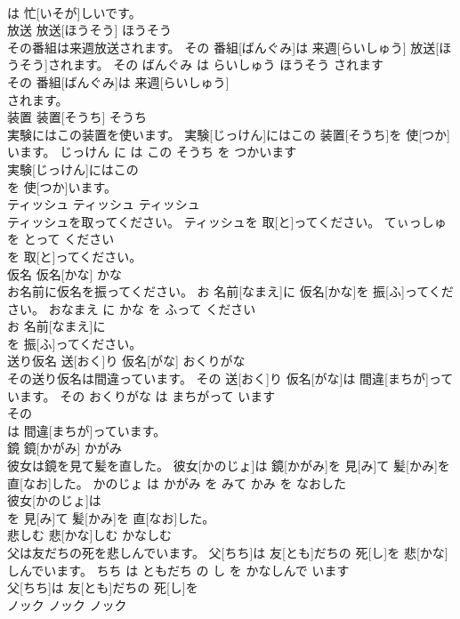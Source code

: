 \documentclass[8pt]{extreport}
\begin{document}
\begin{CJK}{UTF8}{min}
\\	は 忙[いそが]しいです。			
\\	放送	放送[ほうそう]	ほうそう	
\\	その番組は来週放送されます。	その 番組[ばんぐみ]は 来週[らいしゅう] 放送[ほうそう]されます。	その ばんぐみ は らいしゅう ほうそう されます	
\\	その 番組[ばんぐみ]は 来週[らいしゅう]
\\	されます。			
\\	装置	装置[そうち]	そうち	
\\	実験にはこの装置を使います。	実験[じっけん]にはこの 装置[そうち]を 使[つか]います。	じっけん に は この そうち を つかいます	
\\	実験[じっけん]にはこの
\\	を 使[つか]います。			
\\	ティッシュ	ティッシュ	ティッシュ	
\\	ティッシュを取ってください。	ティッシュを 取[と]ってください。	てぃっしゅ を とって ください	
\\	を 取[と]ってください。			
\\	仮名	仮名[かな]	かな	
\\	お名前に仮名を振ってください。	お 名前[なまえ]に 仮名[かな]を 振[ふ]ってください。	おなまえ に かな を ふって ください	
\\	お 名前[なまえ]に
\\	を 振[ふ]ってください。			
\\	送り仮名	送[おく]り 仮名[がな]	おくりがな	
\\	その送り仮名は間違っています。	その 送[おく]り 仮名[がな]は 間違[まちが]っています。	その おくりがな は まちがって います	
\\	その
\\	は 間違[まちが]っています。			
\\	鏡	鏡[かがみ]	かがみ	
\\	彼女は鏡を見て髪を直した。	彼女[かのじょ]は 鏡[かがみ]を 見[み]て 髪[かみ]を 直[なお]した。	かのじょ は かがみ を みて かみ を なおした	
\\	彼女[かのじょ]は
\\	を 見[み]て 髪[かみ]を 直[なお]した。			
\\	悲しむ	悲[かな]しむ	かなしむ	
\\	父は友だちの死を悲しんでいます。	父[ちち]は 友[とも]だちの 死[し]を 悲[かな]しんでいます。	ちち は ともだち の し を かなしんで います	
\\	父[ちち]は 友[とも]だちの 死[し]を
\\	ノック	ノック	ノック	

\end{CJK}
\end{document}
